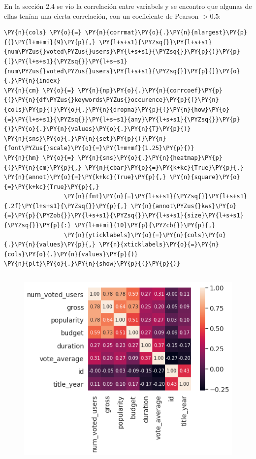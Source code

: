 En la sección 2.4 se vio la correlación entre variabels y se encontro
que algunas de ellas tenían una cierta correlación, con un coeficiente
de Pearson \(>0.5\):

    \begin{tcolorbox}[breakable, size=fbox, boxrule=1pt, pad at break*=1mm,colback=cellbackground, colframe=cellborder]
\begin{Verbatim}[commandchars=\\\{\}]
\PY{n}{cols} \PY{o}{=} \PY{n}{corrmat}\PY{o}{.}\PY{n}{nlargest}\PY{p}{(}\PY{l+m+mi}{9}\PY{p}{,} \PY{l+s+s1}{\PYZsq{}}\PY{l+s+s1}{num\PYZus{}voted\PYZus{}users}\PY{l+s+s1}{\PYZsq{}}\PY{p}{)}\PY{p}{[}\PY{l+s+s1}{\PYZsq{}}\PY{l+s+s1}{num\PYZus{}voted\PYZus{}users}\PY{l+s+s1}{\PYZsq{}}\PY{p}{]}\PY{o}{.}\PY{n}{index}
\PY{n}{cm} \PY{o}{=} \PY{n}{np}\PY{o}{.}\PY{n}{corrcoef}\PY{p}{(}\PY{n}{df\PYZus{}keywords\PYZus{}occurence}\PY{p}{[}\PY{n}{cols}\PY{p}{]}\PY{o}{.}\PY{n}{dropna}\PY{p}{(}\PY{n}{how}\PY{o}{=}\PY{l+s+s1}{\PYZsq{}}\PY{l+s+s1}{any}\PY{l+s+s1}{\PYZsq{}}\PY{p}{)}\PY{o}{.}\PY{n}{values}\PY{o}{.}\PY{n}{T}\PY{p}{)}
\PY{n}{sns}\PY{o}{.}\PY{n}{set}\PY{p}{(}\PY{n}{font\PYZus{}scale}\PY{o}{=}\PY{l+m+mf}{1.25}\PY{p}{)}
\PY{n}{hm} \PY{o}{=} \PY{n}{sns}\PY{o}{.}\PY{n}{heatmap}\PY{p}{(}\PY{n}{cm}\PY{p}{,} \PY{n}{cbar}\PY{o}{=}\PY{k+kc}{True}\PY{p}{,} \PY{n}{annot}\PY{o}{=}\PY{k+kc}{True}\PY{p}{,} \PY{n}{square}\PY{o}{=}\PY{k+kc}{True}\PY{p}{,}
                 \PY{n}{fmt}\PY{o}{=}\PY{l+s+s1}{\PYZsq{}}\PY{l+s+s1}{.2f}\PY{l+s+s1}{\PYZsq{}}\PY{p}{,} \PY{n}{annot\PYZus{}kws}\PY{o}{=}\PY{p}{\PYZob{}}\PY{l+s+s1}{\PYZsq{}}\PY{l+s+s1}{size}\PY{l+s+s1}{\PYZsq{}}\PY{p}{:} \PY{l+m+mi}{10}\PY{p}{\PYZcb{}}\PY{p}{,} 
                 \PY{n}{yticklabels}\PY{o}{=}\PY{n}{cols}\PY{o}{.}\PY{n}{values}\PY{p}{,} \PY{n}{xticklabels}\PY{o}{=}\PY{n}{cols}\PY{o}{.}\PY{n}{values}\PY{p}{)}
\PY{n}{plt}\PY{o}{.}\PY{n}{show}\PY{p}{(}\PY{p}{)}
\end{Verbatim}
\end{tcolorbox}

\begin{figure}[h]
    \centering
    \captionsetup{width=10cm}
    \includegraphics[height=10cm]{./contenido/imagenes/output_83_0.png}
\end{figure}

